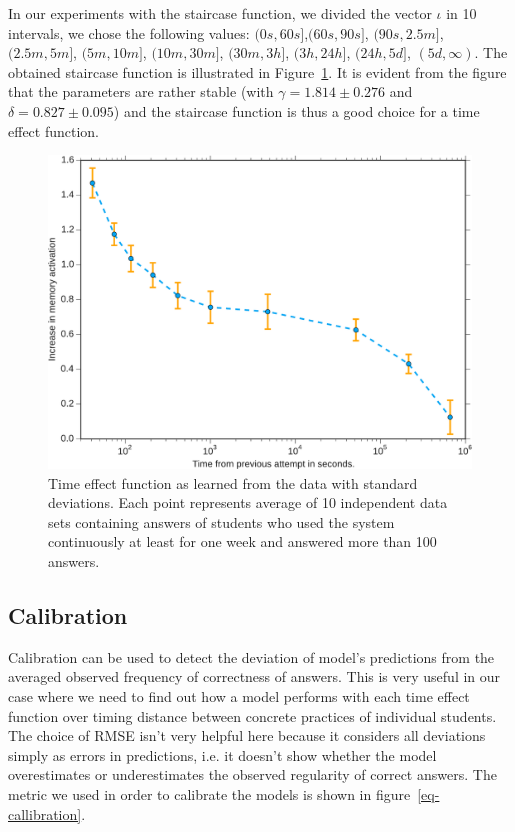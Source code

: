 In our experiments with the staircase function, we divided the vector $\iota$ in 10 intervals, we chose the following values: $(0s, 60s]$,$(60s, 90s]$, $(90s, 2.5m]$, $(2.5m, 5m]$, $(5m, 10m]$, $(10m, 30m]$, $(30m, 3h]$, $(3h, 24h]$, $(24h, 5d]$, $(5d, \infty)$. The obtained staircase function is illustrated in Figure~\ref{learned-time-effect-function}. It is evident from the figure that the parameters are rather stable (with $\gamma = 1.814 \pm 0.276$ and $\delta = 0.827 \pm 0.095$) and the staircase function is thus a good choice for a time effect function.

\begin{figure}[htbp]
  \centering
  \includegraphics[width=\textwidth]{img/learned-time-effect-function}
  \caption{Time effect function as learned from the data with standard deviations. Each point represents average of 10 independent data sets containing answers of students who used the system continuously at least for one week and answered more than 100 answers.}
  \label{learned-time-effect-function}
\end{figure}

\subsection{Calibration}

Calibration can be used to detect the deviation of model's predictions from the averaged observed frequency of correctness of answers. This is very useful in our case where we need to find out how a model performs with each time effect function over timing distance between concrete practices of individual students. The choice of RMSE isn't very helpful here because it considers all deviations simply as errors in predictions, i.e. it doesn't show whether the model overestimates or underestimates the observed regularity of correct answers. The metric we used in order to calibrate the models is shown in figure~\ref{eq-callibration}.

